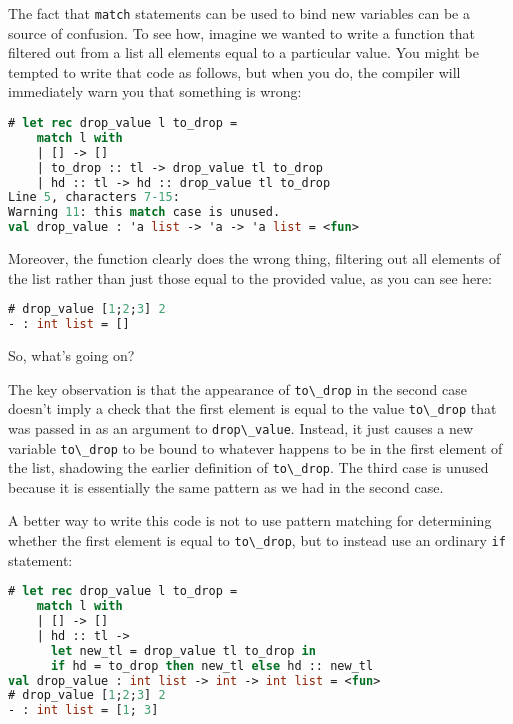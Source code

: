 The fact that \passthrough{\lstinline!match!} statements can be used to
bind new variables can be a source of confusion. To see how, imagine we
wanted to write a function that filtered out from a list all elements
equal to a particular value. You might be tempted to write that code as
follows, but when you do, the compiler will immediately warn you that
something is wrong:

\begin{lstlisting}[language=Caml]
# let rec drop_value l to_drop =
    match l with
    | [] -> []
    | to_drop :: tl -> drop_value tl to_drop
    | hd :: tl -> hd :: drop_value tl to_drop
Line 5, characters 7-15:
Warning 11: this match case is unused.
val drop_value : 'a list -> 'a -> 'a list = <fun>
\end{lstlisting}

Moreover, the function clearly does the wrong thing, filtering out all
elements of the list rather than just those equal to the provided value,
as you can see here:

\begin{lstlisting}[language=Caml]
# drop_value [1;2;3] 2
- : int list = []
\end{lstlisting}

So, what's going on?

The key observation is that the appearance of
\passthrough{\lstinline!to\_drop!} in the second case doesn't imply a
check that the first element is equal to the value
\passthrough{\lstinline!to\_drop!} that was passed in as an argument to
\passthrough{\lstinline!drop\_value!}. Instead, it just causes a new
variable \passthrough{\lstinline!to\_drop!} to be bound to whatever
happens to be in the first element of the list, shadowing the earlier
definition of \passthrough{\lstinline!to\_drop!}. The third case is
unused because it is essentially the same pattern as we had in the
second case.

A better way to write this code is not to use pattern matching for
determining whether the first element is equal to
\passthrough{\lstinline!to\_drop!}, but to instead use an ordinary
\passthrough{\lstinline!if!} statement:

\begin{lstlisting}[language=Caml]
# let rec drop_value l to_drop =
    match l with
    | [] -> []
    | hd :: tl ->
      let new_tl = drop_value tl to_drop in
      if hd = to_drop then new_tl else hd :: new_tl
val drop_value : int list -> int -> int list = <fun>
# drop_value [1;2;3] 2
- : int list = [1; 3]
\end{lstlisting}

